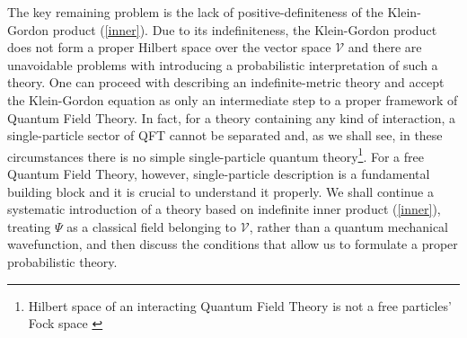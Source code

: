 \documentclass[11pt]{article}
\numberwithin{equation}{section}
\begin{document}
     The key remaining problem is the lack of positive-definiteness of the Klein-Gordon product (\ref{inner}).
     Due to its indefiniteness, the Klein-Gordon product does not form a proper Hilbert space over the vector space $\mathcal{V}$ and there are
     unavoidable problems with introducing a probabilistic interpretation of such a theory.
     One can proceed with describing an indefinite-metric theory and accept the Klein-Gordon equation as only
     an intermediate step to a proper framework of Quantum Field Theory.
     In fact, for a theory containing any kind of interaction, a single-particle sector of QFT cannot be separated
     and, as we shall see, in these circumstances there is no simple single-particle quantum theory\footnote{Hilbert space of an interacting Quantum Field Theory is not a free particles' Fock space \cite{weinberg}}.
     For a free Quantum Field Theory, however, single-particle description is a fundamental building block
     and it is crucial to understand it properly.
     We shall continue a systematic introduction of a theory based on indefinite inner product (\ref{inner}), treating
     $\Psi$ as a classical field belonging to $\mathcal{V}$, rather than a quantum mechanical wavefunction,
     and then discuss the conditions that allow us to formulate a proper probabilistic theory.      

\end{document}

